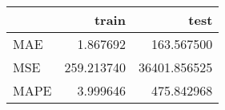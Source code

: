 \begin{tabular}{lrr}
\toprule
{} &       train &          test \\
\midrule
MAE  &    1.867692 &    163.567500 \\
MSE  &  259.213740 &  36401.856525 \\
MAPE &    3.999646 &    475.842968 \\
\bottomrule
\end{tabular}
